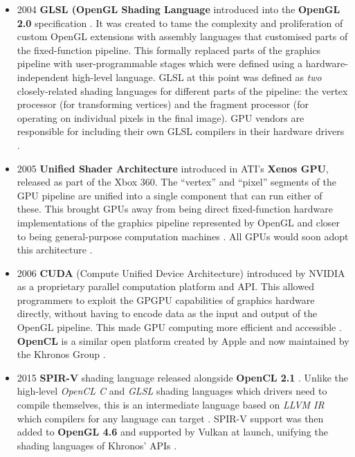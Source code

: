 \documentclass[a4paper,12pt,twoside,openright]{report}
\begin{document}
\begin{itemize}
    \item 2004 \textbf{GLSL (OpenGL Shading Language} introduced into the
    \textbf{OpenGL 2.0} specification \cite{GLSL_1_10}. It was created to tame
    the complexity and proliferation of custom OpenGL extensions with assembly
    languages that customised parts of the fixed-function pipeline. This
    formally replaced parts of the graphics pipeline with user-programmable
    stages which were defined using a hardware-independent high-level language.
    GLSL at this point was defined as \textit{two} closely-related shading
    languages for different parts of the pipeline: the vertex processor (for
    transforming vertices) and the fragment processor (for operating on
    individual pixels in the final image). GPU vendors are responsible for
    including their own GLSL compilers in their hardware drivers
    \cite{TripThroughGraphicsPipeline1}.

    \item 2005 \textbf{Unified Shader Architecture} introduced in ATI's
    \textbf{Xenos GPU}, released as part of the Xbox 360. The ``vertex'' and
    ``pixel'' segments of the GPU pipeline are unified into a single component
    that can run either of these. This brought GPUs away from being direct
    fixed-function hardware implementations of the graphics pipeline
    represented by OpenGL and closer to being general-purpose computation
    machines \cite{XenosDemystified}. All GPUs would soon adopt this
    architecture \cite{HistoryOfTheGPU}.

    \item 2006 \textbf{CUDA} (Compute Unified Device Architecture) introduced
    by NVIDIA as a proprietary parallel computation platform and API. This
    allowed programmers to exploit the GPGPU capabilities of graphics hardware
    directly, without having to encode data as the input and output of the
    OpenGL pipeline. This made GPU computing more efficient and accessible
    \cite{AboutCUDA}. \textbf{OpenCL} is a similar open platform created by
    Apple and now maintained by the Khronos Group \cite{OpenCL}.

    \item 2015 \textbf{SPIR-V} shading language released alongside
    \textbf{OpenCL 2.1} \cite{SPIRVLaunch}. Unlike the high-level
    \textit{OpenCL C} and \textit{GLSL} shading languages which drivers need to
    compile themselves, this is an intermediate language based on \textit{LLVM
    IR} which compilers for any language can target \cite{LLVMIR} \cite{SPIRV}.
    SPIR-V support was then added to \textbf{OpenGL 4.6} and supported by
    Vulkan at launch, unifying the shading languages of Khronos' APIs
    \cite{SPIRVOpenGL}.


\end{itemize}
\end{document}
